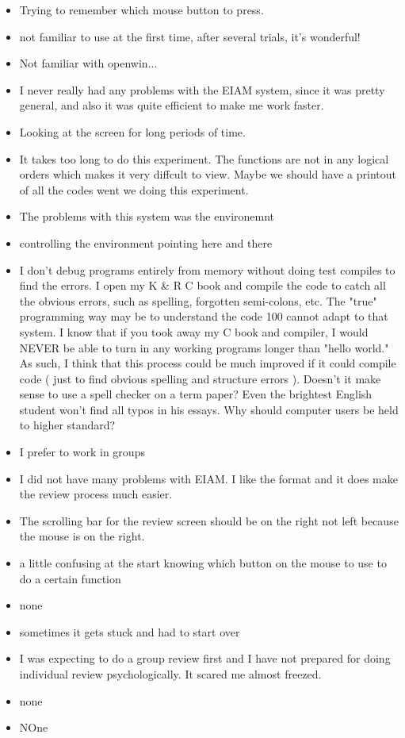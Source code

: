 \begin{enumerate}
\begin{itemize}
\item Trying to remember which mouse button to press.
\item  not familiar to use at the first time, after several trials, it's
 wonderful!

\item Not familiar with openwin...
\item I never really had any problems with the EIAM system, since it was
pretty general, and also it was quite efficient to make me work
faster.

\item Looking at the screen for long periods of time.
\item It takes too long to do this experiment.  The functions are not in any
logical orders which makes it very diffcult to view.  Maybe we should
have a printout of all the codes went we doing this experiment. 
\item The problems with this  system was the environemnt
\item controlling the environment
pointing here and there

\item     I don't debug programs entirely from memory without doing test
compiles to find the errors.  I open my K \& R C book and compile the
code to catch all the obvious errors, such as spelling, forgotten
semi-colons, etc.  The "true" programming way may be to understand the
code 100%
cannot adapt to that system.  I know that if you took away my C book
and compiler, I would NEVER be able to turn in any working programs longer
than "hello world."  
    As such, I think that this process could be much improved
if it could compile code ( just to find obvious spelling and structure
errors ).  Doesn't it make sense to use a spell checker on a term
paper?  Even the brightest English student won't find all typos in his
essays.  Why should computer users be held to higher standard?
\item I prefer to work in groups
\item I did not have many problems with EIAM.  I like the format and it does
make the review process much easier.
\item The scrolling bar for the review screen should be on the right not
left because the mouse is on the right.
\item a little confusing at the start knowing which button on the mouse to
use to do a certain function 
\item none
\item sometimes it gets stuck and had to start over
\item I was expecting to do a group review first and I have not prepared for
doing individual review psychologically.  It scared me almost freezed.
\item none
\item NOne
\end{itemize}


\end{enumerate}
